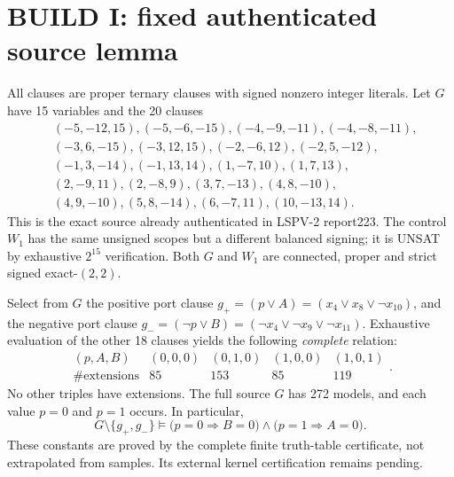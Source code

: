 \documentclass[11pt]{article}
\begin{document}
\section{BUILD I: fixed authenticated source lemma}
All clauses are proper ternary clauses with signed nonzero integer literals. Let $G$ have 15 variables and the 20 clauses
\begin{align*}
&(-5,-12,15),(-5,-6,-15),(-4,-9,-11),(-4,-8,-11),\\
&(-3,6,-15),(-3,12,15),(-2,-6,12),(-2,5,-12),\\
&(-1,3,-14),(-1,13,14),(1,-7,10),(1,7,13),\\
&(2,-9,11),(2,-8,9),(3,7,-13),(4,8,-10),\\
&(4,9,-10),(5,8,-14),(6,-7,11),(10,-13,14).
\end{align*}
This is the exact source already authenticated in LSPV-2 report223. The control $W_1$ has the same unsigned scopes but a different balanced signing; it is UNSAT by exhaustive $2^{15}$ verification. Both $G$ and $W_1$ are connected, proper and strict signed exact-$(2,2)$.

Select from $G$ the positive port clause $g_+=(p\vee A)=(x_4\vee x_8\vee\neg x_{10})$, and the negative port clause $g_-=(\neg p\vee B)=(\neg x_4\vee\neg x_9\vee\neg x_{11})$. Exhaustive evaluation of the other 18 clauses yields the following \emph{complete} relation:
\[
\begin{array}{c|rrrr}
(p,A,B)&(0,0,0)&(0,1,0)&(1,0,0)&(1,0,1)\\\hline
\#\text{extensions}&85&153&85&119
\end{array}.
\]
No other triples have extensions. The full source $G$ has 272 models, and each value $p=0$ and $p=1$ occurs. In particular,
\[
G\setminus\{g_+,g_-\}\models\bigl(p=0\Rightarrow B=0\bigr)\land\bigl(p=1\Rightarrow A=0\bigr).
\]
These constants are proved by the complete finite truth-table certificate, not extrapolated from samples. Its external kernel certification remains pending.
\end{document}

